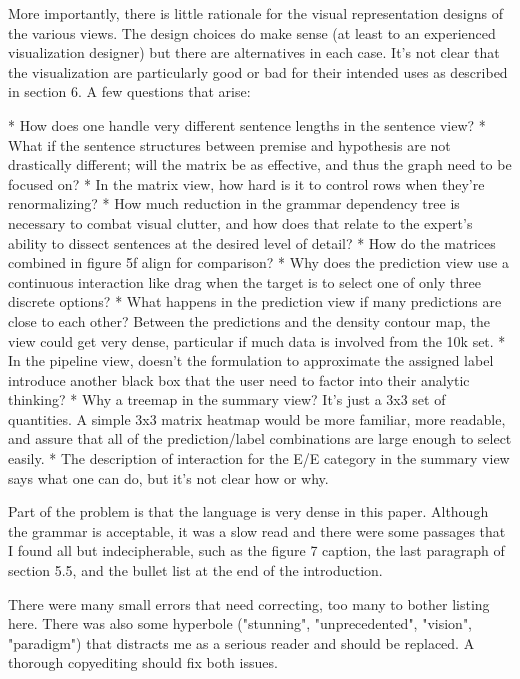 More importantly, there is little rationale for the visual representation designs of the various views. The design choices do make sense (at least to an experienced visualization designer) but there are alternatives in each case. It's not clear that the visualization are particularly good or bad for their intended uses as described in section 6. A few questions that arise:

* How does one handle very different sentence lengths in the sentence view?
* What if the sentence structures between premise and hypothesis are not drastically different; will the matrix be as effective, and thus the graph need to be focused on?
* In the matrix view, how hard is it to control rows when they're renormalizing?
* How much reduction in the grammar dependency tree is necessary to combat visual clutter, and how does that relate to the expert's ability to dissect sentences at the desired level of detail?
* How do the matrices combined in figure 5f align for comparison?
* Why does the prediction view use a continuous interaction like drag when the target is to select one of only three discrete options?
* What happens in the prediction view if many predictions are close to each other? Between the predictions and the density contour map, the view could get very dense, particular if much data is involved from the 10k set.
* In the pipeline view, doesn't the formulation to approximate the assigned label introduce another black box that the user need to factor into their analytic thinking?
* Why a treemap in the summary view? It's just a 3x3 set of quantities. A simple 3x3 matrix heatmap would be more familiar, more readable, and assure that all of the prediction/label combinations are large enough to select easily.
* The description of interaction for the E/E category in the summary view says what one can do, but it's not clear how or why.

Part of the problem is that the language is very dense in this paper. Although the grammar is acceptable, it was a slow read and there were some passages that I found all but indecipherable, such as the figure 7 caption, the last paragraph of section 5.5, and the bullet list at the end of the introduction. 

There were many small errors that need correcting, too many to bother listing here. There was also some hyperbole ("stunning", "unprecedented", "vision", "paradigm") that distracts me as a serious reader and should be replaced. A thorough copyediting should fix both issues.


